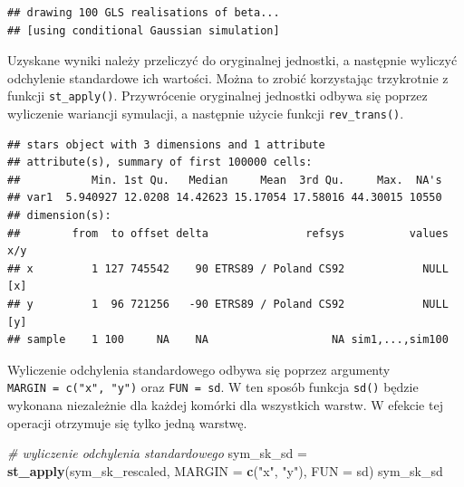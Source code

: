 \documentclass[
  paper=6in:9in,pagesize=pdftex,headinclude=on,footinclude=on,10pt]{scrbook}
\newenvironment{Shaded}{\begin{snugshade}}{\end{snugshade}}
\newcommand{\AttributeTok}[1]{\textcolor[rgb]{0.13,0.29,0.53}{#1}}
\newcommand{\CommentTok}[1]{\textcolor[rgb]{0.56,0.35,0.01}{\textit{#1}}}
\newcommand{\DecValTok}[1]{\textcolor[rgb]{0.00,0.00,0.81}{#1}}
\newcommand{\FunctionTok}[1]{\textcolor[rgb]{0.13,0.29,0.53}{\textbf{#1}}}
\newcommand{\NormalTok}[1]{#1}
\newcommand{\OtherTok}[1]{\textcolor[rgb]{0.56,0.35,0.01}{#1}}
\newcommand{\SpecialCharTok}[1]{\textcolor[rgb]{0.81,0.36,0.00}{\textbf{#1}}}
\newcommand{\StringTok}[1]{\textcolor[rgb]{0.31,0.60,0.02}{#1}}
\begin{document}
\begin{verbatim}
## drawing 100 GLS realisations of beta...
## [using conditional Gaussian simulation]
\end{verbatim}

Uzyskane wyniki należy przeliczyć do oryginalnej jednostki, a następnie wyliczyć odchylenie standardowe ich wartości.
Można to zrobić korzystając trzykrotnie z funkcji \texttt{st\_apply()}.
Przywrócenie oryginalnej jednostki odbywa się poprzez wyliczenie wariancji symulacji, a następnie użycie funkcji \texttt{rev\_trans()}.

\begin{Shaded}
\end{Shaded}

\begin{verbatim}
## stars object with 3 dimensions and 1 attribute
## attribute(s), summary of first 100000 cells:
##           Min. 1st Qu.   Median     Mean  3rd Qu.     Max.  NA's
## var1  5.940927 12.0208 14.42623 15.17054 17.58016 44.30015 10550
## dimension(s):
##        from  to offset delta               refsys          values x/y
## x         1 127 745542    90 ETRS89 / Poland CS92            NULL [x]
## y         1  96 721256   -90 ETRS89 / Poland CS92            NULL [y]
## sample    1 100     NA    NA                   NA sim1,...,sim100
\end{verbatim}

Wyliczenie odchylenia standardowego odbywa się poprzez argumenty \texttt{MARGIN\ =\ c("x",\ "y")} oraz \texttt{FUN\ =\ sd}.
W ten sposób funkcja \texttt{sd()} będzie wykonana niezależnie dla każdej komórki dla wszystkich warstw.
W efekcie tej operacji otrzymuje się tylko jedną warstwę.

\begin{Shaded}
\begin{Highlighting}[]
\CommentTok{\# wyliczenie odchylenia standardowego}
\NormalTok{sym\_sk\_sd }\OtherTok{=} \FunctionTok{st\_apply}\NormalTok{(sym\_sk\_rescaled, }\AttributeTok{MARGIN =} \FunctionTok{c}\NormalTok{(}\StringTok{"x"}\NormalTok{, }\StringTok{"y"}\NormalTok{), }\AttributeTok{FUN =}\NormalTok{ sd)}
\NormalTok{sym\_sk\_sd}
\end{Highlighting}
\end{Shaded}
\end{document}
